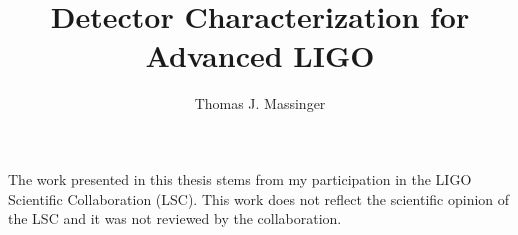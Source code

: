 \documentclass[12pt,notitlepage]{report}
\newcommand{\prd}{{\it Phys. Rev. D}}
\begin{document}
\title{Detector Characterization for Advanced LIGO}
\author{Thomas J. Massinger}
\havededicationtrue
\dedication{Well that was fun.}
\haveminorfalse
\copyrighttrue
\doctoratetrue
\figurespagetrue
\tablespagetrue
\electronicsubmitfalse


\Acknowledgments{
}

\beforepreface

The work presented in this thesis stems from my participation in the LIGO
Scientific Collaboration (LSC). This work does not reflect the
scientific opinion of the LSC and it was not reviewed by the collaboration.



%
%
%
%
%
%
%


\afterpreface

\label{ch:introduction}


\label{ch:CBCSearches}


\label{ch:o1results}


\label{ch:instrumentalDetchar}


\label{ch:IMCUpconversion}


\label{ch:ODC}


\label{ch:Vetoes}

\end{document}
